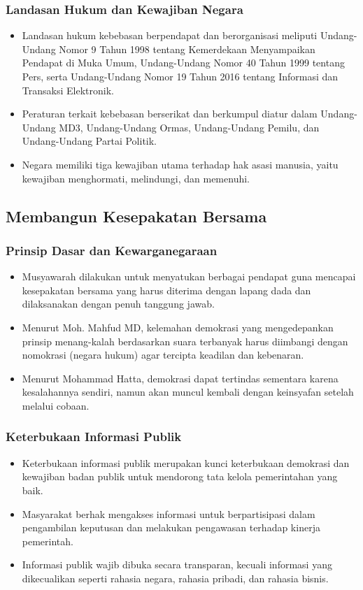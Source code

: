 \subsubsection{Landasan Hukum dan Kewajiban Negara}
\begin{itemize}
\item Landasan hukum kebebasan berpendapat dan berorganisasi meliputi Undang-Undang Nomor 9 Tahun 1998 tentang Kemerdekaan Menyampaikan Pendapat di Muka Umum, Undang-Undang Nomor 40 Tahun 1999 tentang Pers, serta Undang-Undang Nomor 19 Tahun 2016 tentang Informasi dan Transaksi Elektronik.
\item Peraturan terkait kebebasan berserikat dan berkumpul diatur dalam Undang-Undang MD3, Undang-Undang Ormas, Undang-Undang Pemilu, dan Undang-Undang Partai Politik.
\item Negara memiliki tiga kewajiban utama terhadap hak asasi manusia, yaitu kewajiban menghormati, melindungi, dan memenuhi.
\end{itemize}

\subsection{Membangun Kesepakatan Bersama}

\subsubsection{Prinsip Dasar dan Kewarganegaraan}
\begin{itemize}
\item Musyawarah dilakukan untuk menyatukan berbagai pendapat guna mencapai kesepakatan bersama yang harus diterima dengan lapang dada dan dilaksanakan dengan penuh tanggung jawab.
\item Menurut Moh. Mahfud MD, kelemahan demokrasi yang mengedepankan prinsip menang-kalah berdasarkan suara terbanyak harus diimbangi dengan nomokrasi (negara hukum) agar tercipta keadilan dan kebenaran.
\item Menurut Mohammad Hatta, demokrasi dapat tertindas sementara karena kesalahannya sendiri, namun akan muncul kembali dengan keinsyafan setelah melalui cobaan.
\end{itemize}

\subsubsection{Keterbukaan Informasi Publik}
\begin{itemize}
\item Keterbukaan informasi publik merupakan kunci keterbukaan demokrasi dan kewajiban badan publik untuk mendorong tata kelola pemerintahan yang baik.
\item Masyarakat berhak mengakses informasi untuk berpartisipasi dalam pengambilan keputusan dan melakukan pengawasan terhadap kinerja pemerintah.
\item Informasi publik wajib dibuka secara transparan, kecuali informasi yang dikecualikan seperti rahasia negara, rahasia pribadi, dan rahasia bisnis.
\end{itemize}

